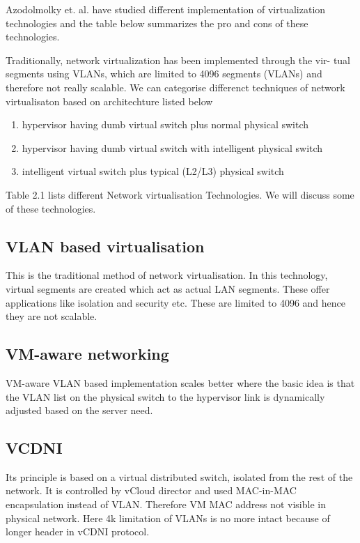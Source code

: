 Azodolmolky et. al. \cite{azodolmolky2013sdn} have studied different implementation of virtualization technologies and the table below summarizes the pro and cons of these technologies.

Traditionally, network virtualization has been implemented through the vir-
tual segments using VLANs, which are limited to 4096 segments (VLANs) and
therefore not really scalable.
We can categorise differenct techniques of network virtualisaton based on architechture listed below

\begin{enumerate}
    \item hypervisor having dumb virtual switch plus normal physical switch
    \item hypervisor having dumb virtual switch with intelligent physical switch
    \item intelligent virtual switch plus typical (L2/L3) physical switch
\end{enumerate}

Table 2.1 lists different Network virtualisation Technologies. We will discuss some of these technologies. 
\subsection{VLAN based virtualisation}
This is the traditional method of network virtualisation. In this technology, virtual segments are created which act as actual LAN segments. These offer applications like isolation and security etc. These are limited to 4096 and hence they are not scalable.

\subsection{VM-aware networking}
VM-aware VLAN based implementation scales better where the basic idea is
that the VLAN list on the physical switch to the hypervisor link is dynamically
adjusted based on the server need.

\subsection{VCDNI} Its principle is based on a virtual distributed switch, isolated from the rest of the network. It is controlled by vCloud director and used MAC-in-MAC encapsulation instead of VLAN. Therefore VM MAC address not visible in physical network. Here 4k limitation of VLANs is no more intact because of longer header in vCDNI protocol.


